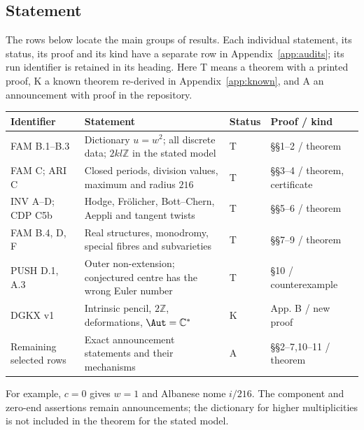 \subsection*{Statement}
\noindent The rows below locate the main groups of results. Each individual statement, its status, its proof and its kind have a separate row in Appendix~\ref{app:audits}; its run identifier is retained in its heading. Here T means a theorem with a printed proof, K a known theorem re-derived in Appendix~\ref{app:known}, and A an announcement with proof in the repository.
\begin{center}\small
\begin{tabularx}{\linewidth}{@{}lYll@{}}
\toprule Identifier & Statement & Status & Proof / kind\\\midrule
FAM B.1--B.3 & Dictionary $u=w^2$; all discrete data; $2kl\mathbb Z$ in the stated model & T & \S\S1--2 / theorem\\
FAM C; ARI C & Closed periods, division values, maximum and radius $216$ & T & \S\S3--4 / theorem, certificate\\
INV A--D; CDP C5b & Hodge, Fr\"olicher, Bott--Chern, Aeppli and tangent twists & T & \S\S5--6 / theorem\\
FAM B.4, D, F & Real structures, monodromy, special fibres and subvarieties & T & \S\S7--9 / theorem\\
PUSH D.1, A.3 & Outer non-extension; conjectured centre has the wrong Euler number & T & \S10 / counterexample\\
DGKX v1 & Intrinsic pencil, $2\mathbb Z$, deformations, $\Aut=\mathbb C^*$ & K & App. B / new proof\\
Remaining selected rows & Exact announcement statements and their mechanisms & A & \S\S2--7,10--11 / theorem\\
\bottomrule
\end{tabularx}
\end{center}
For example, $c=0$ gives $w=1$ and Albanese nome $i/216$. The component and zero-end assertions remain announcements; the dictionary for higher multiplicities is not included in the theorem for the stated model.

